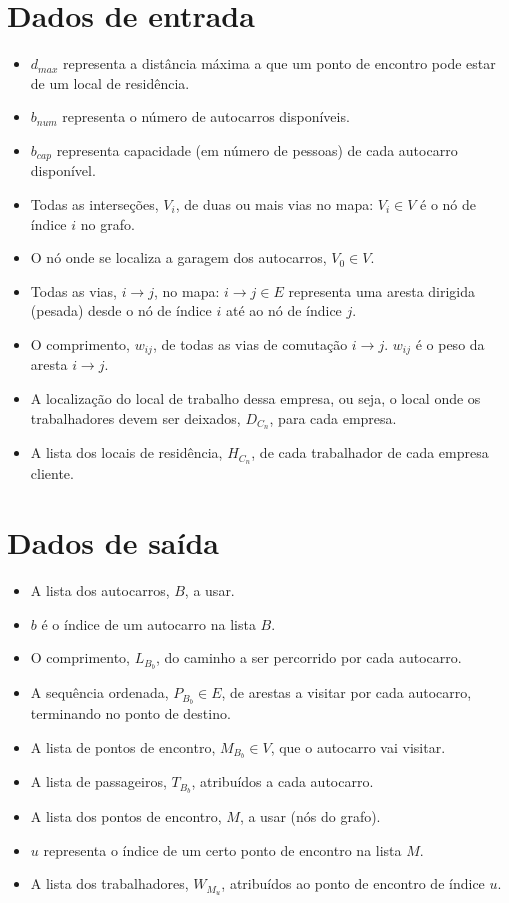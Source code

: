 \documentclass{report}
\begin{document}
  \section{Dados de entrada}
    \begin{itemize}
    \item $d_{max}$ representa a distância máxima a que um ponto de encontro
      pode estar de um local de residência.
    \item $b_{num}$ representa o número de autocarros disponíveis.
    \item $b_{cap}$ representa capacidade (em número de pessoas) de cada
      autocarro disponível.

    \item Todas as interseções, $V_i$, de duas ou mais vias no mapa: $V_i \in V$
      é o nó de índice $i$ no grafo.
    \item O nó onde se localiza a garagem dos autocarros, $V_0 \in V$.

    \item Todas as vias, $i\rightarrow j$, no mapa: $i\rightarrow j \in E$
      representa uma aresta dirigida (pesada) desde o nó de índice $i$ até ao nó
      de índice $j$.
    \item O comprimento, $w_{ij}$, de todas as vias de comutação $i\rightarrow j$.
      $w_{ij}$ é o peso da aresta $i\rightarrow j$.

    \item A localização do local de trabalho dessa empresa, ou seja, o local
      onde os trabalhadores devem ser deixados, $D_{C_n}$, para cada empresa.
    \item A lista dos locais de residência, $H_{C_n}$, de cada trabalhador
      de cada empresa cliente.
    \end{itemize}
  \section{Dados de saída}
    \begin{itemize}
    \item A lista dos autocarros, $B$, a usar.
    \item $b$ é o índice de um autocarro na lista $B$.
    \item O comprimento, $L_{B_b}$, do caminho a ser percorrido por cada autocarro.
    \item A sequência ordenada, $P_{B_b} \in E$, de arestas a visitar por cada
      autocarro, terminando no ponto de destino.
    \item A lista de pontos de encontro, $M_{B_b} \in V$, que o autocarro vai visitar.
    \item A lista de passageiros, $T_{B_b}$, atribuídos a cada autocarro.

    \item A lista dos pontos de encontro, $M$, a usar (nós do grafo).
    \item $u$ representa o índice de um certo ponto de encontro na lista $M$.
    \item A lista dos trabalhadores, $W_{M_u}$, atribuídos ao ponto de encontro
      de índice $u$.
    \end{itemize}
    \newpage
\end{document}
